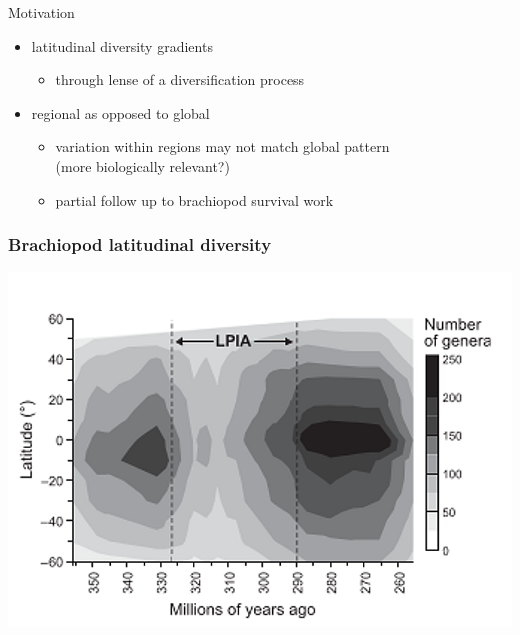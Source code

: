 \documentclass{beamer}
\begin{document}
\begin{frame}
  \begin{block}{Motivation}
    \begin{itemize}
      \item latitudinal diversity gradients
        \begin{itemize}
          \item through lense of a diversification process
        \end{itemize}
      \item regional as opposed to global
        \begin{itemize}
          \item variation within regions may not match global pattern \\(more biologically relevant?)
          \item partial follow up to brachiopod survival work
        \end{itemize}
    \end{itemize}
  \end{block}
\end{frame}

\begin{frame}
  \frametitle{Brachiopod latitudinal diversity}
  \begin{center}
    \includegraphics[width=\textwidth,height=0.8\textheight,keepaspectratio=true]{figure/powell_2007}
  \end{center}

\end{frame}
\end{document}
